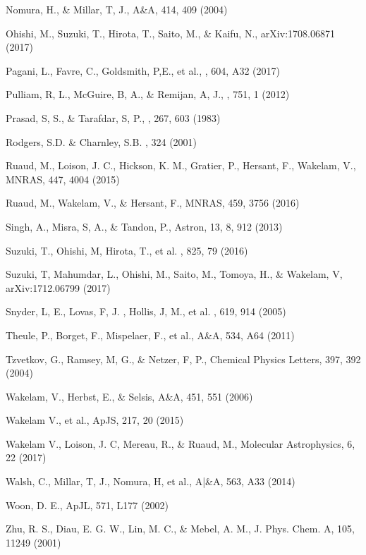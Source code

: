 \documentclass{aastex61}
\begin{document}
\begin{thebibliography}{}
 Nomura, H., \& Millar, T, J., A\&A, 414, 409 (2004)

 Ohishi, M., Suzuki, T., Hirota, T., Saito, M., \& Kaifu, N., arXiv:1708.06871 (2017)

 Pagani, L., Favre, C., Goldsmith, P,E., et al., \apj, 604, A32 (2017)

 Pulliam, R, L., McGuire, B, A., \& Remijan, A, J., \apj, 751, 1 (2012) 

 Prasad, S, S., \& Tarafdar, S, P., \apj, 267, 603 (1983)

 Rodgers, S.D. \& Charnley, S.B. , 324 (2001)

 Ruaud, M., Loison, J. C., Hickson, K. M., Gratier, P., Hersant, F., Wakelam, V., MNRAS, 447, 4004 (2015)

 Ruaud, M., Wakelam, V., \& Hersant, F., MNRAS, 459, 3756 (2016)

 Singh, A., Misra, S, A., \& Tandon, P., Astron, 13, 8, 912 (2013)

 Suzuki, T., Ohishi, M, Hirota, T., et al. \apj,  825, 79 (2016) 

 Suzuki, T, Mahumdar, L., Ohishi, M., Saito, M., Tomoya, H., \& Wakelam, V, arXiv:1712.06799 (2017)

 Snyder, L, E., Lovas, F, J. , Hollis, J, M., et al. \apj, 619, 914 (2005) 

 Theule, P., Borget, F., Mispelaer, F., et al., A\&A, 534, A64 (2011)

 Tzvetkov, G., Ramsey, M, G., \& Netzer, F, P., Chemical Physics Letters, 397, 392 (2004)

 Wakelam, V., Herbst, E., \& Selsis, A\&A, 451, 551 (2006)

 Wakelam V., et al., ApJS, 217, 20 (2015)

 Wakelam V., Loison, J. C, Mereau, R., \& Ruaud, M., Molecular Astrophysics, 6, 22 (2017)

 Walsh, C., Millar, T, J., Nomura, H, et al., A|\&A, 563, A33 (2014)

 Woon, D. E., ApJL, 571, L177 (2002)

 Zhu, R. S., Diau, E. G. W., Lin, M. C., \& Mebel, A. M., J. Phys. Chem. A, 105, 11249 (2001)

\end{thebibliography}
\end{document}
